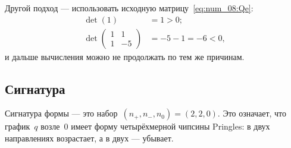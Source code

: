 \begin{solution}
	Другой подход --- использовать исходную матрицу~\eqref{eq:num_08:Qe}:
	\begin{align*}
		\det(1) &= 1 > 0;
		\\
		\det
		\left( 
			\begin{array}{rr}
				1 & 1 \\
				1 & -5
			\end{array}
		\right)
		&=
		-5-1 = -6 < 0,
	\end{align*}
	и дальше вычисления можно не продолжать по тем же причинам.

	\subsection{Сигнатура}
	Сигнатура формы --- это набор~$(n_+, n_-, n_0) = (2, 2, 0)$.
	Это означает, что график~$q$ возле~$0$ имеет форму четырёхмерной чипсины Pringles: в двух направлениях возрастает, а в двух --- убывает.
\end{solution}
